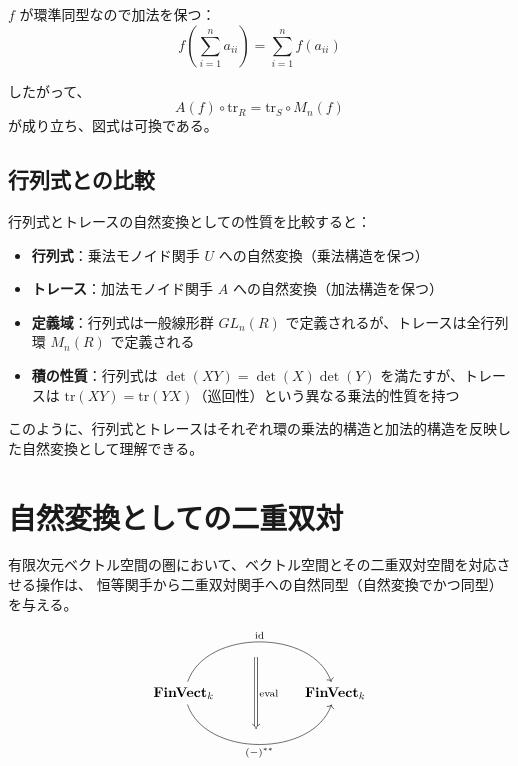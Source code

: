 \documentclass[uplatex,a4j,12pt,dvipdfmx]{jsarticle}
\begin{document}
$f$ が環準同型なので加法を保つ：
\[
	f\left(\sum_{i=1}^n a_{ii}\right) = \sum_{i=1}^n f(a_{ii})
\]

したがって、
\[
	A(f) \circ \text{tr}_R = \text{tr}_S \circ M_n(f)
\]
が成り立ち、図式は可換である。

\subsection{行列式との比較}

行列式とトレースの自然変換としての性質を比較すると：

\begin{itemize}
	\item \textbf{行列式}：乗法モノイド関手 $U$ への自然変換（乗法構造を保つ）
	\item \textbf{トレース}：加法モノイド関手 $A$ への自然変換（加法構造を保つ）
	\item \textbf{定義域}：行列式は一般線形群 $GL_n(R)$ で定義されるが、トレースは全行列環 $M_n(R)$ で定義される
	\item \textbf{積の性質}：行列式は $\det(XY) = \det(X)\det(Y)$ を満たすが、トレースは $\text{tr}(XY) = \text{tr}(YX)$（巡回性）という異なる乗法的性質を持つ
\end{itemize}

このように、行列式とトレースはそれぞれ環の乗法的構造と加法的構造を反映した自然変換として理解できる。





\section{自然変換としての二重双対}

有限次元ベクトル空間の圏において、ベクトル空間とその二重双対空間を対応させる操作は、
恒等関手から二重双対関手への自然同型（自然変換でかつ同型）を与える。

\[
	\begin{tikzcd}
		& {} \arrow[dd, "\text{eval}", Rightarrow, shift right] &                      \\
		\textbf{FinVect}_{k} \arrow[rr, "\text{id}", bend left=71] \arrow[rr, "(-)^{**}"', bend right=71] &                                                       & \textbf{FinVect}_{k} \\
		& {}                                                    &
	\end{tikzcd}
\]
\end{document}
